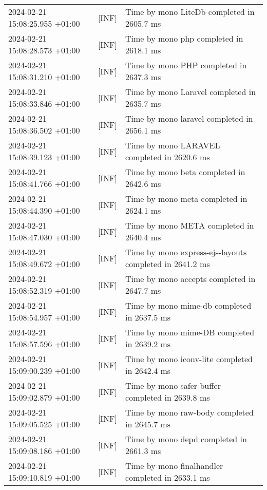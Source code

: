 {{\begin{tabularx}{\textwidth}{|l|l|X|}
                    2024-02-21 15:08:25.955 +01:00 & [INF] & Time by mono LiteDb completed in 2605.7 ms \\
                    2024-02-21 15:08:28.573 +01:00 & [INF] & Time by mono php completed in 2618.1 ms \\
                    2024-02-21 15:08:31.210 +01:00 & [INF] & Time by mono PHP completed in 2637.3 ms \\
                    2024-02-21 15:08:33.846 +01:00 & [INF] & Time by mono Laravel completed in 2635.7 ms \\
                    2024-02-21 15:08:36.502 +01:00 & [INF] & Time by mono laravel completed in 2656.1 ms \\
                    2024-02-21 15:08:39.123 +01:00 & [INF] & Time by mono LARAVEL completed in 2620.6 ms \\
                    2024-02-21 15:08:41.766 +01:00 & [INF] & Time by mono beta completed in 2642.6 ms \\
                    2024-02-21 15:08:44.390 +01:00 & [INF] & Time by mono meta completed in 2624.1 ms \\
                    2024-02-21 15:08:47.030 +01:00 & [INF] & Time by mono META completed in 2640.4 ms \\
                    2024-02-21 15:08:49.672 +01:00 & [INF] & Time by mono express-ejs-layouts completed in 2641.2 ms \\
                    2024-02-21 15:08:52.319 +01:00 & [INF] & Time by mono accepts completed in 2647.7 ms \\
                    2024-02-21 15:08:54.957 +01:00 & [INF] & Time by mono mime-db completed in 2637.5 ms \\
                    2024-02-21 15:08:57.596 +01:00 & [INF] & Time by mono mime-DB completed in 2639.2 ms \\
                    2024-02-21 15:09:00.239 +01:00 & [INF] & Time by mono iconv-lite completed in 2642.4 ms \\
                    2024-02-21 15:09:02.879 +01:00 & [INF] & Time by mono safer-buffer completed in 2639.8 ms \\
                    2024-02-21 15:09:05.525 +01:00 & [INF] & Time by mono raw-body completed in 2645.7 ms \\
                    2024-02-21 15:09:08.186 +01:00 & [INF] & Time by mono depd completed in 2661.3 ms \\
                    2024-02-21 15:09:10.819 +01:00 & [INF] & Time by mono finalhandler completed in 2633.1 ms \\

\end{tabularx}}}
